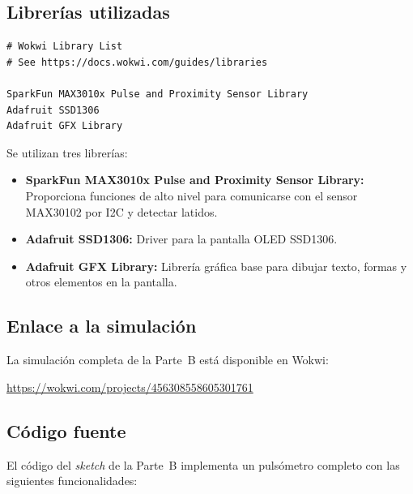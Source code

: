 \documentclass[11pt,a4paper]{article}
\begin{document}
\subsection{Librerías utilizadas}

\begin{lstlisting}[caption={libraries.txt -- Parte B}, label={lst:libs-b}]
# Wokwi Library List
# See https://docs.wokwi.com/guides/libraries

SparkFun MAX3010x Pulse and Proximity Sensor Library
Adafruit SSD1306
Adafruit GFX Library
\end{lstlisting}

Se utilizan tres librerías:
\begin{itemize}
    \item \textbf{SparkFun MAX3010x Pulse and Proximity Sensor Library:} Proporciona funciones de alto nivel para comunicarse con el sensor MAX30102 por I2C y detectar latidos.
    \item \textbf{Adafruit SSD1306:} Driver para la pantalla OLED SSD1306.
    \item \textbf{Adafruit GFX Library:} Librería gráfica base para dibujar texto, formas y otros elementos en la pantalla.
\end{itemize}

\subsection{Enlace a la simulación}

La simulación completa de la Parte~B está disponible en Wokwi:

\begin{center}
\url{https://wokwi.com/projects/456308558605301761}
\end{center}

\subsection{Código fuente}

El código del \textit{sketch} de la Parte~B implementa un pulsómetro completo con las siguientes funcionalidades:
\end{document}
